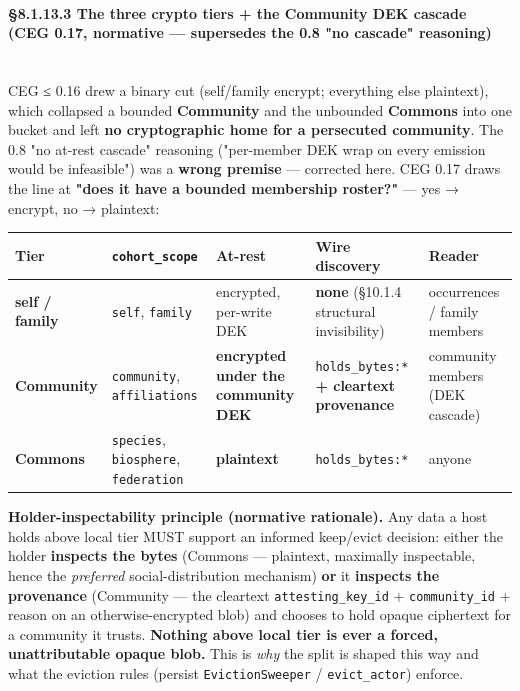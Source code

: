 \documentclass[11pt]{article}
\begin{document}
\paragraph{§8.1.13.3 The three crypto tiers + the Community DEK cascade (CEG 0.17, normative — supersedes the 0.8 "no cascade" reasoning)}\mbox{}\\


CEG ≤ 0.16 drew a binary cut (self/family encrypt; everything else plaintext), which collapsed a bounded \textbf{Community} and the unbounded \textbf{Commons} into one bucket and left \textbf{no cryptographic home for a persecuted community}. The 0.8 "no at-rest cascade" reasoning ("per-member DEK wrap on every emission would be infeasible") was a \textbf{wrong premise} — corrected here. CEG 0.17 draws the line at \textbf{"does it have a bounded membership roster?"} — yes → encrypt, no → plaintext:


{\scriptsize
\begin{longtable}{|p{3.2cm}|p{3.2cm}|p{3.2cm}|p{3.2cm}|p{3.2cm}|}\hline
\textbf{Tier} & \textbf{\texttt{cohort\_scope}} & \textbf{At-rest} & \textbf{Wire discovery} & \textbf{Reader} \\ \hline\endhead
\textbf{self / family} & \texttt{self}, \texttt{family} & encrypted, per-write DEK & \textbf{none} (§10.1.4 structural invisibility) & occurrences / family members \\ \hline
\textbf{Community} & \texttt{community}, \texttt{affiliations} & \textbf{encrypted under the community DEK} & \texttt{holds\_bytes:*} \textbf{+ cleartext provenance} & community members (DEK cascade) \\ \hline
\textbf{Commons} & \texttt{species}, \texttt{biosphere}, \texttt{federation} & \textbf{plaintext} & \texttt{holds\_bytes:*} & anyone \\ \hline
\end{longtable}}



\textbf{Holder-inspectability principle (normative rationale).} Any data a host holds above local tier MUST support an informed keep/evict decision: either the holder \textbf{inspects the bytes} (Commons — plaintext, maximally inspectable, hence the \textit{preferred} social-distribution mechanism) \textbf{or} it \textbf{inspects the provenance} (Community — the cleartext \texttt{attesting\_key\_id} + \texttt{community\_id} + reason on an otherwise-encrypted blob) and chooses to hold opaque ciphertext for a community it trusts. \textbf{Nothing above local tier is ever a forced, unattributable opaque blob.} This is \textit{why} the split is shaped this way and what the eviction rules (persist \texttt{EvictionSweeper} / \texttt{evict\_actor}) enforce.
\end{document}
